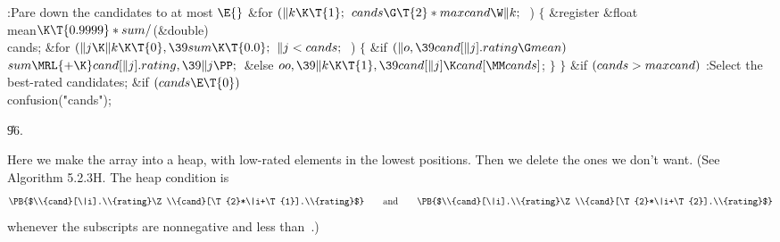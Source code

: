 \Y\B\4:Pare down the candidates to at most \X${}\E{}$\6
\&{for} ${}(\|k\K\T{1};{}$ ${}\\{cands}\G\T{2}*\\{maxcand}\W\|k;{}$ \,)\5
${}\{{}$\1\6
\&{register} \&{float} \\{mean}${}\K\T{0.9999}*\\{sum}/{}$(\&{double}) %
\\{cands};\7
\&{for} ${}(\|j\K\|k\K\T{0},\39\\{sum}\K\T{0.0};{}$ ${}\|j<\\{cands};{}$ \,)\5
${}\{{}$\1\6
\&{if} ${}(\|o,\39\\{cand}[\|j].\\{rating}\G\\{mean}){}$\1\5
${}\\{sum}\MRL{+{\K}}\\{cand}[\|j].\\{rating},\39\|j\PP;{}$\2\6
\&{else}\1\5
${}\\{oo},\39\|k\K\T{1},\39\\{cand}[\|j]\K\\{cand}[\MM\\{cands}]{}$;\2\6
\4${}\}{}$\2\6
\4${}\}{}$\2\6
\&{if} ${}(\\{cands}>\\{maxcand}){}$\1\5
:Select the  best-rated candidates\X;\2\6
\&{if} ${}(\\{cands}\E\T{0}){}$\1\5
\\{confusion}(\.{"cands"});\2\par
\U96.\fi

Here we make the  array into a heap, with
low-rated elements
in the lowest positions. Then we delete the ones we don't want.
(See Algorithm 5.2.3H. The heap condition is
$$\hbox{\PB{$\\{cand}[\|i].\\{rating}\Z\\{cand}[\T{2}*\|i+\T{1}].\\{rating}$}%
\qquad
and\qquad \PB{$\\{cand}[\|i].\\{rating}\Z\\{cand}[\T{2}*\|i+\T{2}].%
\\{rating}$}}$$
whenever the subscripts are nonnegative and less than~.)

